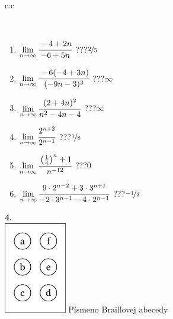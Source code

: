 \documentclass[10pt]{report}
\begin{document}
\begin{tabular}{c:c}
\begin{minipage}[c][104.5mm][t]{0.5\linewidth}
\begin{center}
\begin{minipage}{0.95\linewidth}
\begin{center}
\end{center}
\end{minipage}
\\[1mm]
\begin{minipage}{0.79\linewidth}
\begin{center}
\begin{varwidth}{\linewidth}
\begin{enumerate}
\normalsize
\item $\lim\limits_{n\to\infty}\cfrac{-4+2n}{-6+5n}$\quad \dotfill\; ???\;\dotfill \quad $\nicefrac{2}{5}$
\item $\lim\limits_{n\to\infty}\cfrac{-6(-4+3n)}{(-9n-3)^2}$\quad \dotfill\; ???\;\dotfill \quad $\infty$
\item $\lim\limits_{n\to\infty}\cfrac{(2+4n)^2}{n^2-4n-4}$\quad \dotfill\; ???\;\dotfill \quad $\infty$
\item $\lim\limits_{n\to\infty}\cfrac{2^{n+2}}{2^{n-1}}$\quad \dotfill\; ???\;\dotfill \quad $\nicefrac{1}{8}$
\item $\lim\limits_{n\to\infty}\cfrac{\left(\frac{1}{4}\right)^n +1}{n^{-12}}$\quad \dotfill\; ???\;\dotfill \quad $0$
\item $\lim\limits_{n\to\infty}\cfrac{9\cdot 2^{n-2}+3\cdot 3^{n+1}}{-2\cdot 3^{n-1}-4\cdot 2^{n-1}}$\quad \dotfill\; ???\;\dotfill \quad $\nicefrac{-1}{2}$
\end{enumerate}
\end{varwidth}
\end{center}
\end{minipage}
\begin{minipage}{0.20\linewidth}
\begin{center}
{\Huge\bfseries 4.} \\[2mm]
\includegraphics[height=40mm]{../images/braille.png}
{\small Písmeno Braillovej abecedy}
\end{center}
\end{minipage}
\end{center}
\end{minipage}
%
\end{tabular}
\newpage
\thispagestyle{empty}
\end{document}
